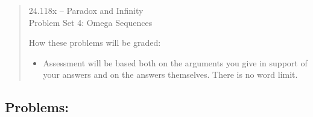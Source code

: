 \documentclass[12pt,a4paper]{article}
\begin{document}
\begin{quote}

\begin{center} {\large 24.118x -- Paradox and Infinity \\ \vspace{1mm}}
 {\large Problem Set 4: Omega Sequences \\ \vspace{1mm}}
 
\end{center}
\vspace{3mm}

\noindent How these problems will be graded:

\begin{itemize} 
\item Assessment will be based both on the arguments you give in support of your answers and on the answers themselves. There is no word limit.
\end{itemize} 

\end{quote}

\subsection*{Problems:}
\end{document}
